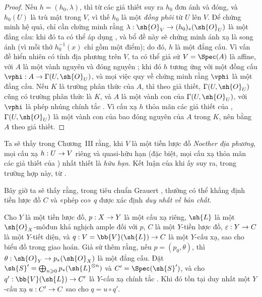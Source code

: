 \documentclass[oneside,10pt]{amsart}
\makeatletter
\renewcommand{\geq}{\geqslant}
\newcommand{\ega@arrow}[2]{\mathchoice{#1}{#2}{#2}{#2}}
\renewcommand{\to}{\ega@arrow{\longrightarrow}{\rightarrow}}
\newcommand{\oldpage}[2][]{\marginnote{\normalfont\footnotesize\textbf{#1}~|~#2}\ignorespaces}
\let\EGAOriginalLabel\label
\renewcommand{\label}[1]{\phantomsection\EGAOriginalLabel{#1}}
\makeatother
\begin{document}
\begin{proof}
Nếu $h=(h_0,\lambda)$, thì từ các giả thiết suy ra $h_0$ đơn ánh và đóng, và $h_0(U)$
\oldpage[II]{190}
là trù mật trong $V$, vì thế $h_0$ là một \emph{đồng phôi} từ $U$ lên $V$.
Để chứng minh hệ quả, chỉ cần chứng minh rằng $\lambda:\sh{O}_V\to(h_0)_*(\sh{O}_U)$ là một đẳng cấu: khi đó ta có thể áp dụng , và bổ đề này sẽ chứng minh ánh xạ  là song ánh (vì mỗi thớ $h_0^{-1}(x)$ chỉ gồm một điểm);
do đó, $h$ là một đẳng cấu.
Vì vấn đề hiển nhiên có tính địa phương trên $V$, ta có thể giả sử $V=\Spec(A)$ là affine, với $A$ là một vành nguyên và đóng nguyên ;
khi đó $h$ tương ứng  với một đồng cấu $\vphi:A\to\Gamma(U,\sh{O}_U)$, và mọi việc quy về chứng minh rằng $\vphi$ là một đẳng cấu.
Nếu $K$ là trường phân thức của $A$, thì theo giả thiết, $\Gamma(U,\sh{O}_U)$ cũng có trường phân thức là $K$, và $A$ là một vành con của $\Gamma(U,\sh{O}_U)$, với $\vphi$ là phép nhúng chính tắc .
Vì cấu xạ $h$ thỏa mãn các giả thiết của , $\Gamma(U,\sh{O}_U)$ là một vành con của bao đóng nguyên của $A$ trong $K$, nên bằng $A$ theo giả thiết.
\end{proof}

\begin{remark}[8.11.3]
\label{II.8.11.3}
Ta sẽ thấy trong Chương~III  rằng, khi $V$ là một tiền lược đồ \emph{Noether địa phương}, mọi cấu xạ $h:U\to V$ riêng và quasi-hữu hạn (đặc biệt, mọi cấu xạ thỏa mãn các giả thiết của ) nhất thiết là \emph{hữu hạn}.
Kết luận của  khi ấy suy ra, trong trường hợp này, từ .
\end{remark}

\begin{env}[8.11.4]
\label{II.8.11.4}
Bây giờ ta sẽ thấy rằng, trong tiêu chuẩn Grauert , thường có thể khẳng định tiền lược đồ $C$ và «phép co» $q$ được xác định \emph{duy nhất về bản chất}.
\end{env}

\begin{lemma}[8.11.5]
\label{II.8.11.5}
Cho $Y$ là một tiền lược đồ, $p:X\to Y$ là một cấu xạ riêng, $\sh{L}$ là một $\sh{O}_X$-môđun khả nghịch ample đối với $p$, $C$ là một $Y$-tiền lược đồ, $\varepsilon:Y\to C$ là một $Y$-tiết diện, và $q:V=\bb{V}(\sh{L})\to C$ là một $Y$-cấu xạ, sao cho biểu đồ trong  giao hoán.
Giả sử thêm rằng, nếu $p=(p_0,\theta)$, thì $\theta:\sh{O}_Y\to p_*(\sh{O}_X)$ là một đẳng cấu.
Đặt $\sh{S}'=\bigoplus_{n\geq0}p_*(\sh{L}^{\otimes n})$ và $C'=\Spec(\sh{S}')$, và cho $q':\bb{V}(\sh{L})\to C'$ là $Y$-cấu xạ chính tắc .
Khi đó tồn tại duy nhất một $Y$-cấu xạ $u:C'\to C$ sao cho $q=u\circ q'$.
\end{lemma}
\end{document}
